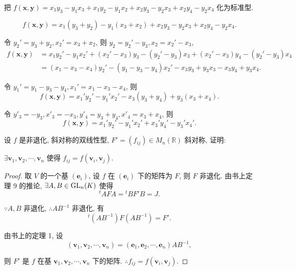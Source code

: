 \documentclass{ctexart}
\begin{document}
\begin{exercisec}%
    把 $f(\boldsymbol{x},\boldsymbol{y})=x_1y_3-y_1x_3+x_1y_2-y_1x_2+x_2y_3-y_2x_3+x_2y_4-y_2x_4$ 化为标准型.
\end{exercisec}
\begin{solution}
    \[f(\boldsymbol{x},\boldsymbol{y})=x_1(y_3+y_2)-y_1(x_3+x_2)+x_2y_3-y_2x_3+x_2y_4-y_2x_4.\]

    令 $y_2'=y_3+y_2,x_2'=x_3+x_2$, 则 $y_2=y_2'-y_3,x_2=x_2'-x_3$,
    \begin{align*}
        f(\boldsymbol{x},\boldsymbol{y}) & =x_1y_2'-y_1x_2'+(x_2'-x_3)y_3-(y_2'-y_3)x_3+(x_2'-x_3)y_4-(y_2'-y_3)x_4 \\
        & =(x_1-x_3-x_4)y_2'-(y_1-y_3-y_4)x_2'-x_3y_3+y_3x_3-x_3y_4+y_3x_4.
    \end{align*}

    令 $y_1'=y_1-y_3-y_4,x_1'=x_1-x_3-x_4$, 则
    \[f(\boldsymbol{x},\boldsymbol{y})=x_1'y_2'-y_1'x_2'-x_3(y_3+y_4)+y_3(x_3+x_4).\]

    令 $y'_3=-y_3,x'_3=-x_3,y'_4=y_3+y_4,x'_4=x_3+x_4$, 则
    \[f(\boldsymbol{x},\boldsymbol{y})=x_1'y_2'-y_1'x_2'+x_3'y_4'-y_3'x_4'.\]
\end{solution}
\begin{exercisec}%
    设 $f$ 是非退化, 斜对称的双线性型, $F'=(f_{ij})\in M_n(\mathbb{R})$ 斜对称, 证明:
    
    $\exists\boldsymbol{v}_1,\boldsymbol{v}_2,\cdots,\boldsymbol{v}_n$ 使得 $f_{ij}=f(\boldsymbol{v}_i,\boldsymbol{v}_j)$.
\end{exercisec}
\begin{proof}
    取 $V$ 的一个基 $(\boldsymbol{e}_i)$, 设 $f$ 在 $(\boldsymbol{e}_i)$ 下的矩阵为 $F$, 则 $F$ 非退化. 由书上定理 9 的推论, $\exists A,B\in\operatorname{GL} _n(K)$ 使得
    \[{}^tAFA={}^tBF'B=J.\]

    $\because A,B$ 非退化, $\therefore AB^{-1}$ 非退化, 有
    \[{}^t(AB^{-1})F(AB^{-1})=F'.\]

    由书上的定理 1, 设
    \[(\boldsymbol{v}_1,\boldsymbol{v}_2,\cdots,\boldsymbol{v}_n)=(\boldsymbol{e}_1,\boldsymbol{e}_2,\cdots,\boldsymbol{e}_n)AB^{-1},\]

    则 $F'$ 是 $f$ 在基 $\boldsymbol{v}_1,\boldsymbol{v}_2,\cdots,\boldsymbol{v}_n$ 下的矩阵. $\therefore f_{ij}=f(\boldsymbol{v}_i,\boldsymbol{v}_j)$.
\end{proof}
\end{document}
